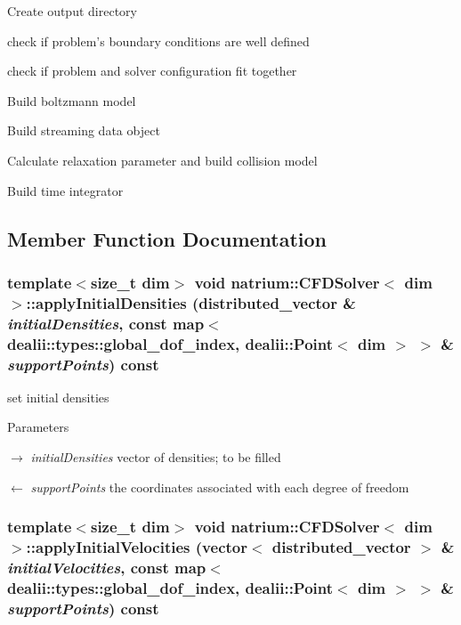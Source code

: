 Create output directory

check if problem's boundary conditions are well defined

check if problem and solver configuration fit together

Build boltzmann model

Build streaming data object

Calculate relaxation parameter and build collision model

Build time integrator 

\subsection{Member Function Documentation}
\hypertarget{classnatrium_1_1CFDSolver_a36146c0f8a6c5abd0ebec4c49f2a4e6d}{
\subsubsection[{applyInitialDensities}]{\setlength{\rightskip}{0pt plus 5cm}template$<$size\_\-t dim$>$ void {\bf natrium::CFDSolver}$<$ dim $>$::applyInitialDensities (distributed\_\-vector \& {\em initialDensities}, \/  const map$<$ dealii::types::global\_\-dof\_\-index, dealii::Point$<$ dim $>$ $>$ \& {\em supportPoints}) const}}
\label{classnatrium_1_1CFDSolver_a36146c0f8a6c5abd0ebec4c49f2a4e6d}


set initial densities 
\begin{DoxyParams}{Parameters}
\item[\mbox{$\rightarrow$} {\em initialDensities}]vector of densities; to be filled \item[\mbox{$\leftarrow$} {\em supportPoints}]the coordinates associated with each degree of freedom \end{DoxyParams}
\hypertarget{classnatrium_1_1CFDSolver_afd82bfa5e1e613ef99b9b870cb73db0e}{
\subsubsection[{applyInitialVelocities}]{\setlength{\rightskip}{0pt plus 5cm}template$<$size\_\-t dim$>$ void {\bf natrium::CFDSolver}$<$ dim $>$::applyInitialVelocities (vector$<$ distributed\_\-vector $>$ \& {\em initialVelocities}, \/  const map$<$ dealii::types::global\_\-dof\_\-index, dealii::Point$<$ dim $>$ $>$ \& {\em supportPoints}) const}}
\label{classnatrium_1_1CFDSolver_afd82bfa5e1e613ef99b9b870cb73db0e}


